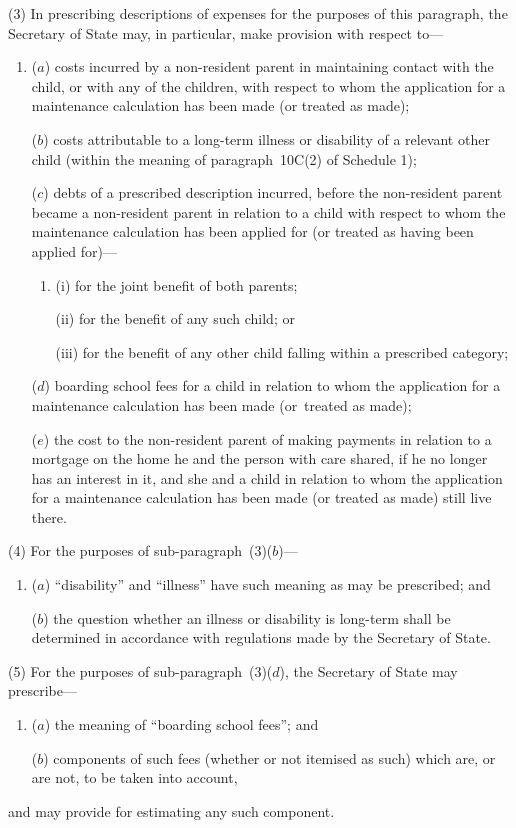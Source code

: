 \documentclass[12pt,a4paper]{article}
\begin{document}
(3) In prescribing descriptions of expenses for the purposes of this paragraph, the Secretary of State may, in particular, make provision with respect to—
\begin{enumerate}\item[]
($a$) costs incurred by a non-resident parent in maintaining contact with the child, or with any of the children, with respect to whom the application for a maintenance calculation has been made (or treated as made);

($b$) costs attributable to a long-term illness or disability of a relevant other child (within the meaning of paragraph~10C(2)  of Schedule 1);

($c$) debts of a prescribed description incurred, before the non-resident parent became a non-resident parent in relation to a child with respect to whom the maintenance calculation has been applied for (or treated as having been applied for)—
\begin{enumerate}\item[]
(i) for the joint benefit of both parents;

(ii) for the benefit of any such child; or

(iii) for the benefit of any other child falling within a prescribed category;
\end{enumerate}

($d$) boarding school fees for a child in relation to whom the application for a maintenance calculation has been made (or~treated as made);

($e$) the cost to the non-resident parent of making payments in relation to a mortgage on the home he and the person with care shared, if he no longer has an interest in it, and she and a child in relation to whom the application for a maintenance calculation has been made (or treated as made) still live there.
\end{enumerate}

(4) For the purposes of sub-paragraph~(3)($b$)—
\begin{enumerate}\item[]
($a$) “disability” and “illness” have such meaning as may be prescribed; and

($b$) the question whether an illness or disability is long-term shall be determined in accordance with regulations made by the Secretary of State.
\end{enumerate}

(5) For the purposes of sub-paragraph~(3)($d$), the Secretary of State may prescribe—
\begin{enumerate}\item[]
($a$) the meaning of “boarding school fees”; and

($b$) components of such fees (whether or not itemised as such) which are, or are not, to be taken into account,
\end{enumerate}
and may provide for estimating any such component.
\end{document}
